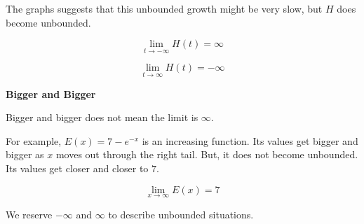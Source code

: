 \documentclass{ximera}
\begin{document}
The graphs suggests that this unbounded growth might be very slow, but $H$ does become unbounded.





\[
\lim\limits_{t \to -\infty} H(t) = \infty
\]



\[
\lim\limits_{t \to \infty} H(t) = -\infty
\]




\begin{warning} \textbf{\textcolor{red!70!black}{Bigger and Bigger}} 


Bigger and bigger does not mean the limit is $\infty$.


For example,  $E(x) = 7 - e^{-x}$ is an increasing function.  Its values get bigger and bigger as $x$ moves out through the right tail. But, it does not become unbounded. Its values get closer and closer to $7$.





\[
\lim\limits_{x \to \infty} E(x) = 7
\]



We reserve $-\infty$ and $\infty$ to describe unbounded situations.

\end{warning}
\end{document}
